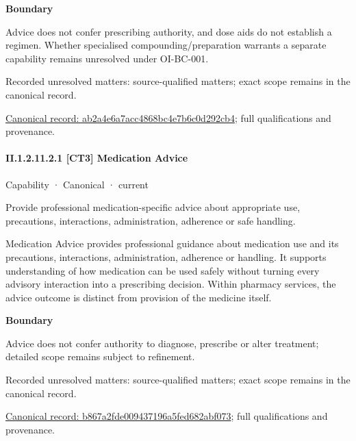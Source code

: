 \textbf{Boundary}



Advice does not confer prescribing authority, and dose aids do not establish a regimen. Whether specialised compounding/preparation warrants a separate capability remains unresolved under OI-BC-001.


{\small Recorded unresolved matters: source-qualified matters; exact scope remains in the canonical record.}\par
{\footnotesize \href{../../../../continuum/strategy/capability/ab2a4e6a7acc4868bc4e7b6c0d292cb4.md}{Canonical record: ab2a4e6a7acc4868bc4e7b6c0d292cb4}; full qualifications and provenance.}\par
\paragraph*{II.1.2.11.2.1 [CT3] Medication Advice}
\label{navigation:II.1.2.11.2.1}

\label{element:b867a2fde009437196a5fed682abf073}
{\small Capability · Canonical · current}\par

Provide professional medication-specific advice about appropriate use, precautions, interactions, administration, adherence or safe handling.



Medication Advice provides professional guidance about medication use and its precautions, interactions, administration, adherence or handling. It supports understanding of how medication can be used safely without turning every advisory interaction into a prescribing decision. Within pharmacy services, the advice outcome is distinct from provision of the medicine itself.



\textbf{Boundary}



Advice does not confer authority to diagnose, prescribe or alter treatment; detailed scope remains subject to refinement.


{\small Recorded unresolved matters: source-qualified matters; exact scope remains in the canonical record.}\par
{\footnotesize \href{../../../../continuum/strategy/capability/b867a2fde009437196a5fed682abf073.md}{Canonical record: b867a2fde009437196a5fed682abf073}; full qualifications and provenance.}\par
